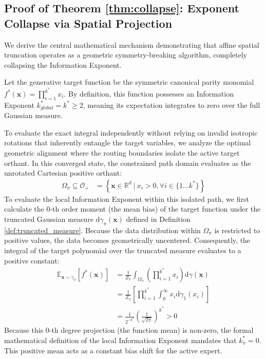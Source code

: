 \documentclass{article}
\newcommand{\E}{\mathbb{E}}
\newcommand{\R}{\mathbb{R}}
\newcommand{\1}{\mathbb{I}}
\newcommand{\diff}{\mathrm{d}}
\newcommand{\bx}{\mathbf{x}}
\begin{document}
\subsection{Proof of Theorem \ref{thm:collapse}: Exponent Collapse via Spatial Projection}
\label{app:thm_reduction}

We derive the central mathematical mechanism demonstrating that affine spatial truncation operates as a geometric symmetry-breaking algorithm, completely collapsing the Information Exponent.

Let the generative target function be the symmetric canonical parity monomial $f^*(\bx) = \prod_{i=1}^{k^*} x_i$. By definition, this function possesses an Information Exponent $k_{global}^* = k^* \ge 2$, meaning its expectation integrates to zero over the full Gaussian measure. 

To evaluate the exact integral independently without relying on invalid isotropic rotations that inherently entangle the target variables, we analyze the optimal geometric alignment where the routing boundaries isolate the active target orthant. In this converged state, the constrained path domain evaluates as the unrotated Cartesian positive orthant:
\begin{align}
    \Omega_\pi \subseteq \mathcal{O}_+ &= \left\{ \bx \in \R^d \ \Big| \ x_i > 0, \forall i \in \{1 \dots k^*\} \right\}
\end{align}
To evaluate the local Information Exponent within this isolated path, we first calculate the 0-th order moment (the mean bias) of the target function under the truncated Gaussian measure $\diff\gamma_\pi(\bx)$ defined in Definition \ref{def:truncated_measure}.
Because the data distribution within $\Omega_\pi$ is restricted to positive values, the data becomes geometrically uncentered. Consequently, the integral of the target polynomial over the truncated measure evaluates to a positive constant:
\begin{align}
    \E_{\bx \sim \gamma_\pi}[f^*(\bx)] &= \frac{1}{Z_\pi} \int_{\Omega_\pi} \left( \prod_{i=1}^{k^*} x_i \right) \diff\gamma(\bx) \nonumber \\
    &= \frac{1}{Z_\pi} \left[ \prod_{i=1}^{k^*} \int_0^\infty x_i \diff\gamma_1(x_i) \right] \nonumber \\
    &= \frac{1}{2^{-k^*}} \left( \frac{1}{\sqrt{2\pi}} \right)^{k^*} > 0
\end{align}
Because this 0-th degree projection (the function mean) is non-zero, the formal mathematical definition of the local Information Exponent mandates that $k_\pi^* = 0$. This positive mean acts as a constant bias shift for the active expert.
\end{document}
